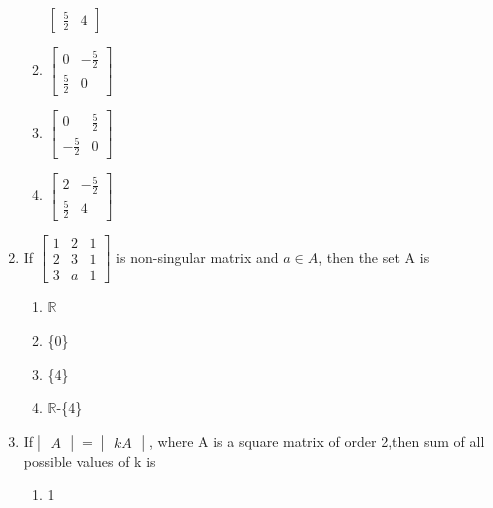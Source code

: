\documentclass[12pt,-letter paper]{article}
\begin{document}
\begin{enumerate}
\begin{enumerate}[label=(\alph*)]
\begin{math}
\begin{bmatrix}
 \frac{5}{2} & 4 
\end{bmatrix} 
\end{math}
    \item \begin{math}
\begin{bmatrix}
0 & -\frac{5}{2} \\
\frac{5}{2} & 0 
\end{bmatrix} 
\end{math}
    \item \begin{math}
\begin{bmatrix}
0 & \frac{5}{2} \\
-\frac{5}{2} & 0 
\end{bmatrix}
\end{math}
    \item \begin{math}
\begin{bmatrix}
2 & -\frac{5}{2} \\
\frac{5}{2} & 4 
\end{bmatrix}
\end{math} 
\end{enumerate}
\item If \begin{math}
\begin{bmatrix}
1 & 2 & 1 \\
2 & 3 & 1 \\
3 & a & 1
\end{bmatrix}
\end{math} is non-singular matrix and  $a \in A $, then the set A is 
\begin{enumerate}[label=(\alph*)]
    \item $\mathbb{R}$
    \item \{0\}
    \item \{4\}
    \item $\mathbb{R}$-\{4\}
\end{enumerate}
\newpage
\item If\begin{math}
     \begin{vmatrix}
    A
\end{vmatrix} = \begin{vmatrix}
    kA
\end{vmatrix}
\end{math}, where A is a square matrix of order 2,then sum of all possible values of k is
\begin{enumerate}[label=(\alph*)]
    \item 1

\end{enumerate}
\end{enumerate}
\end{document}
